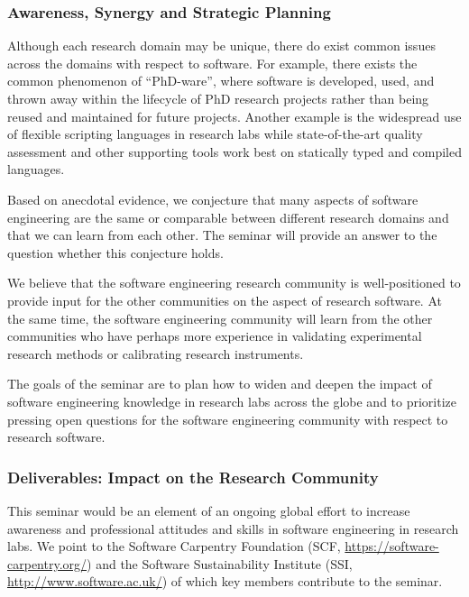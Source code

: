 \documentclass[a4paper,UKenglish]{dagman}
\renewcommand{\paragraph}[1]{\subsubsection*{#1}\xspace}
\begin{document}
\paragraph{Awareness, Synergy and Strategic Planning}

Although each research domain may be unique, there do exist common issues across the domains with respect to software. For example, there exists the common phenomenon of ``PhD-ware'', where software is developed, used, and thrown away within the lifecycle of PhD research projects rather than being reused and maintained for future projects. Another example is the widespread use of flexible scripting languages in research labs while state-of-the-art quality assessment and other supporting tools work best on statically typed and compiled languages.

Based on anecdotal evidence, we conjecture that many aspects of software engineering are the same or comparable between different research domains and that we can learn from each other. The seminar will provide an answer to the question whether this conjecture holds.

We believe that the software engineering research community is well-positioned to provide input for the other communities on the aspect of research software. At the same time, the software engineering community will learn from the other communities who have perhaps more experience in validating experimental research methods or calibrating research instruments. 

The goals of the seminar are to plan how to widen and deepen the impact of software engineering knowledge in research labs across the globe and to prioritize pressing open questions for the software engineering community with respect to research software.

\paragraph{Deliverables: Impact on the Research Community}

This seminar would be an element of an ongoing global effort to increase awareness and professional attitudes and skills in software engineering in research labs. We point to the Software Carpentry Foundation (SCF, \url{https://software-carpentry.org/}) and the Software Sustainability Institute (SSI, \url{http://www.software.ac.uk/}) of which key members contribute to the seminar.
\end{document}
